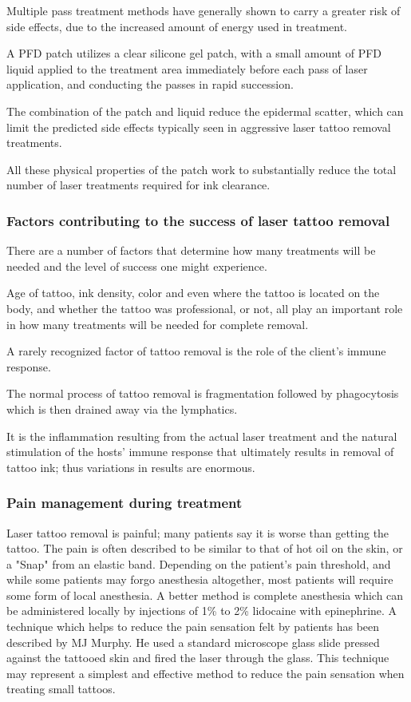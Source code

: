 \documentclass[12pt]{article}
\begin{document}
Multiple pass treatment methods have generally shown to carry a greater risk of side effects, due to the increased amount of energy used in treatment.

A PFD patch utilizes a clear silicone gel patch, with a small amount of PFD liquid applied to the treatment area immediately before each pass of laser application, and conducting the passes in rapid succession.

The combination of the patch and liquid reduce the epidermal scatter, which can limit the predicted side effects typically seen in aggressive laser tattoo removal treatments.

All these physical properties of the patch work to substantially reduce the total number of laser treatments required for ink clearance.
\subsubsection{Factors contributing to the success of laser tattoo removal}
There are a number of factors that determine how many treatments will be needed and the level of success one might experience.

Age of tattoo, ink density, color and even where the tattoo is located on the body, and whether the tattoo was professional, or not, all play an important role in how many treatments will be needed for complete removal.

A rarely recognized factor of tattoo removal is the role of the client's immune response.

The normal process of tattoo removal is fragmentation followed by phagocytosis which is then drained away via the lymphatics.

It is the inflammation resulting from the actual laser treatment and the natural stimulation of the hosts' immune response that ultimately results in removal of tattoo ink; thus variations in results are enormous.
\subsubsection{Pain management during treatment}
Laser tattoo removal is painful; many patients say it is worse than getting the tattoo.
The pain is often described to be similar to that of hot oil on the skin, or a "Snap" from an elastic band.
Depending on the patient's pain threshold, and while some patients may forgo anesthesia altogether, most patients will require some form of local anesthesia.
A better method is complete anesthesia which can be administered locally by injections of 1\% to 2\% lidocaine with epinephrine.
A technique which helps to reduce the pain sensation felt by patients has been described by MJ Murphy.
He used a standard microscope glass slide pressed against the tattooed skin and fired the laser through the glass.
This technique may represent a simplest and effective method to reduce the pain sensation when treating small tattoos.
\end{document}
